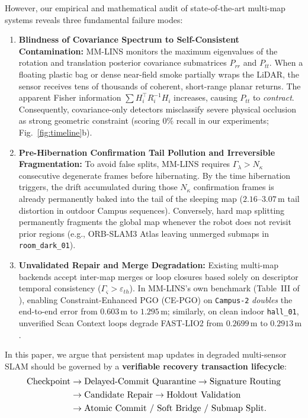\documentclass[journal]{IEEEtran}
\begin{document}
However, our empirical and mathematical audit of state-of-the-art multi-map systems reveals three fundamental failure modes:
\begin{enumerate}
    \item \textbf{Blindness of Covariance Spectrum to Self-Consistent Contamination:} MM-LINS \cite{ma2025mmlins} monitors the maximum eigenvalues of the rotation and translation posterior covariance submatrices $P_{rr}$ and $P_{tt}$. When a floating plastic bag or dense near-field smoke partially wraps the LiDAR, the sensor receives tens of thousands of coherent, short-range planar returns. The apparent Fisher information $\sum H_i^\top R_i^{-1} H_i$ increases, causing $P_{tt}$ to \emph{contract}. Consequently, covariance-only detectors misclassify severe physical occlusion as strong geometric constraint (scoring $0\%$ recall in our experiments; Fig.~\ref{fig:timeline}b).
    \item \textbf{Pre-Hibernation Confirmation Tail Pollution and Irreversible Fragmentation:} To avoid false splits, MM-LINS requires $\Gamma_\lambda > N_\kappa$ consecutive degenerate frames before hibernating. By the time hibernation triggers, the drift accumulated during those $N_\kappa$ confirmation frames is already permanently baked into the tail of the sleeping map ($2.16\text{--}3.07\,\mathrm{m}$ tail distortion in outdoor Campus sequences). Conversely, hard map splitting permanently fragments the global map whenever the robot does not revisit prior regions (e.g., ORB-SLAM3 Atlas leaving unmerged submaps in \texttt{room\_dark\_01}).
    \item \textbf{Unvalidated Repair and Merge Degradation:} Existing multi-map backends accept inter-map merges or loop closures based solely on descriptor temporal consistency ($\Gamma_\varsigma > \varepsilon_{th}$). In MM-LINS's own benchmark (Table~III of \cite{ma2025mmlins}), enabling Constraint-Enhanced PGO (CE-PGO) on \texttt{Campus-2} \emph{doubles} the end-to-end error from $0.603\,\mathrm{m}$ to $1.295\,\mathrm{m}$; similarly, on clean indoor \texttt{hall\_01}, unverified Scan Context loops degrade FAST-LIO2 from $0.2699\,\mathrm{m}$ to $0.2913\,\mathrm{m}$.
\end{enumerate}

In this paper, we argue that persistent map updates in degraded multi-sensor SLAM should be governed by a \textbf{verifiable recovery transaction lifecycle}:
\begin{equation}
\resizebox{0.89\columnwidth}{!}{$
\begin{aligned}
\text{Checkpoint} &\to \text{Delayed-Commit Quarantine} \to \text{Signature Routing} \\
&\to \text{Candidate Repair} \to \text{Holdout Validation} \\
&\to \text{Atomic Commit / Soft Bridge / Submap Split.}
\end{aligned}
$}
\label{eq:lifecycle}
\end{equation}
\end{document}
